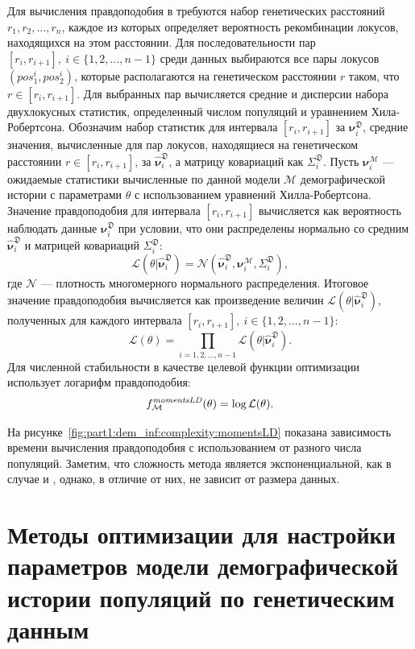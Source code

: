 Для вычисления правдоподобия в \momentsLD требуются набор генетических расстояний $r_1, r_2, \dots, r_n$, каждое из которых  определяет вероятность рекомбинации локусов, находящихся на этом расстоянии.
Для последовательности пар $[r_i, r_{i+1}],\ i \in \{1, 2, \dots, n-1\}$ среди данных выбираются все пары локусов $(pos^i_1, pos^i_2)$, которые располагаются на генетическом расстоянии $r$ таком, что $r \in [r_i, r_{i+1}]$.
Для выбранных пар вычисляется средние и дисперсии набора двухлокусных статистик, определенный числом популяций и уравнением Хила-Робертсона.
Обозначим набор статистик для интервала $[r_i, r_{i+1}]$ за $\boldsymbol{\nu}^\mathfrak{D}_i$, средние значения, вычисленные для пар локусов, находящиеся на генетическом расстоянии $r \in [r_i, r_{i+1}]$, за $\hat{\boldsymbol{\nu}}^\mathfrak{D}_i$, а матрицу ковариаций как $\Sigma^\mathfrak{D}_i$.
Пусть $\boldsymbol{\nu}^\mathcal{M}_i$ --- ожидаемые статистики вычисленные по данной модели $\mathcal{M}$ демографической истории с параметрами $\theta$ с использованием уравнений Хилла-Робертсона.
Значение правдоподобия для интервала $[r_i, r_{i+1}]$ вычисляется как вероятность наблюдать данные $\boldsymbol{\nu}^\mathfrak{D}_i$ при условии, что они распределены нормально со средним $\hat{\boldsymbol{\nu}}^\mathfrak{D}_i$ и матрицей ковариаций $\Sigma^\mathfrak{D}_i$:
$$\mathcal{L}(\theta | \hat{\boldsymbol{\nu}}^\mathfrak{D}_i) = \mathcal{N}(\hat{\boldsymbol{\nu}}^\mathfrak{D}_i, \boldsymbol{\nu}^\mathcal{M}_i, \Sigma^\mathfrak{D}_i),$$
где $\mathcal{N}$ --- плотность многомерного нормального распределения.
Итоговое значение правдоподобия вычисляется как произведение величин $\mathcal{L}(\theta | \hat{\boldsymbol{\nu}}^\mathfrak{D}_i)$, полученных для каждого интервала $[r_i, r_{i+1}],\ i \in \{1, 2, \dots, n-1\}$:
$$\mathcal{L}(\theta) = \prod_{i=1,2, \dots, n-1} \mathcal{L}(\theta | \hat{\boldsymbol{\nu}}^\mathfrak{D}_i).$$
Для численной стабильности в качестве целевой функции оптимизации \momentsLD использует логарифм правдоподобия:
$$f^{\text{\textit{momentsLD}}}_\mathcal{M}(\theta) = \log \mathcal{L}(\theta).$$

На рисунке~\ref{fig:part1:dem_inf:complexity:momentsLD} показана зависимость времени вычисления правдоподобия с использованием \momentsLD от разного числа популяций.
Заметим, что сложность метода является экспоненциальной, как в случае \dadi и \moments, однако, в отличие от них, не зависит от размера данных.


\section{Методы оптимизации для настройки параметров модели демографической истории популяций по генетическим данным}
\label{sec:part1:dem_inf:opt_methods}

